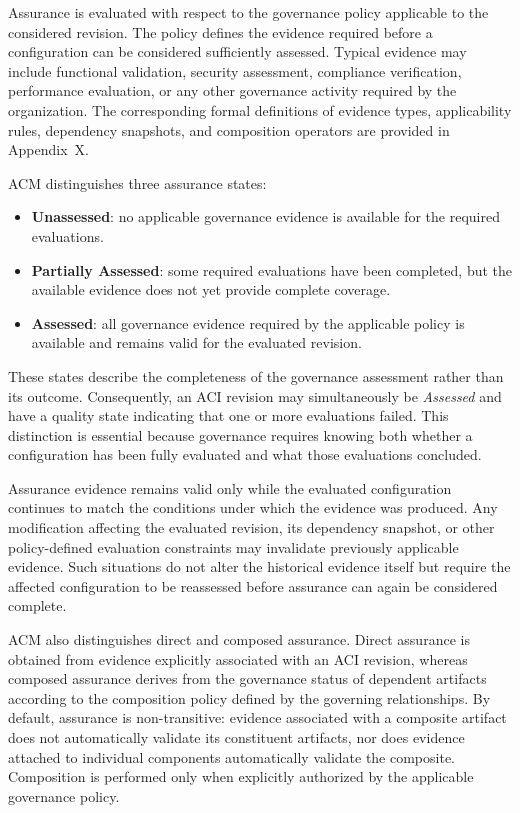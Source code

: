 \documentclass[10pt]{article}
\begin{document}
Assurance is evaluated with respect to the governance policy applicable to the considered revision. The policy defines the evidence required before a configuration can be considered sufficiently assessed. Typical evidence may include functional validation, security assessment, compliance verification, performance evaluation, or any other governance activity required by the organization. The corresponding formal definitions of evidence types, applicability rules, dependency snapshots, and composition operators are provided in Appendix~X.

ACM distinguishes three assurance states:

\begin{itemize}
	\item \textbf{Unassessed}: no applicable governance evidence is available for the required evaluations.
	\item \textbf{Partially Assessed}: some required evaluations have been completed, but the available evidence does not yet provide complete coverage.
	\item \textbf{Assessed}: all governance evidence required by the applicable policy is available and remains valid for the evaluated revision.
\end{itemize}

These states describe the completeness of the governance assessment rather than its outcome. Consequently, an ACI revision may simultaneously be \textit{Assessed} and have a quality state indicating that one or more evaluations failed. This distinction is essential because governance requires knowing both whether a configuration has been fully evaluated and what those evaluations concluded.

Assurance evidence remains valid only while the evaluated configuration continues to match the conditions under which the evidence was produced. Any modification affecting the evaluated revision, its dependency snapshot, or other policy-defined evaluation constraints may invalidate previously applicable evidence. Such situations do not alter the historical evidence itself but require the affected configuration to be reassessed before assurance can again be considered complete.

ACM also distinguishes direct and composed assurance. Direct assurance is obtained from evidence explicitly associated with an ACI revision, whereas composed assurance derives from the governance status of dependent artifacts according to the composition policy defined by the governing relationships. By default, assurance is non-transitive: evidence associated with a composite artifact does not automatically validate its constituent artifacts, nor does evidence attached to individual components automatically validate the composite. Composition is performed only when explicitly authorized by the applicable governance policy.
\end{document}
